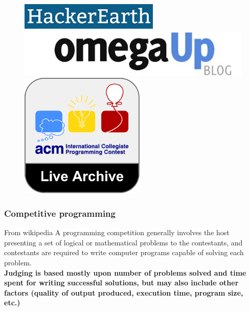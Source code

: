 \documentclass{beamer}
\begin{document}
\begin{frame}
\begin{figure}[!htb]
     \endminipage\hfill
      \includegraphics[width=\linewidth]{images/judges/hackerearth}%
     \endminipage\hfill
      \includegraphics[width=\linewidth]{images/judges/omegaup}%
     \endminipage\hfill
      \includegraphics[width=\linewidth]{images/judges/livearchive}%
     \endminipage\hfill
	\end{figure}
\end{frame}

\begin{frame}
	\frametitle{Competitive programming}
		\begin{block}{From wikipedia}
		A programming competition generally involves the host presenting a set of logical or 		mathematical problems to the contestants, and contestants are required to write computer programs capable of solving each problem. \newline \\
		\textbf{Judging is based mostly upon number of problems solved and time spent for 			writing successful solutions, but may also include other factors (quality of output 			produced, execution time, program size, etc.)}
		\end{block}
\end{frame}
\end{document}
